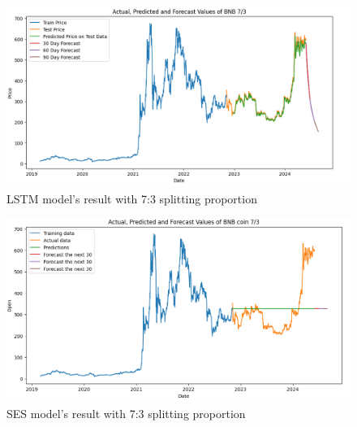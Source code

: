 \documentclass{ieeeojies}
\begin{document}
\vspace{-5mm}
\begin{figure}[H]
  \centering
  \begin{minipage}{0.8\linewidth}
    \centering
    \includegraphics[width=\linewidth]{Image/LSTM/LSTM_BNB_73.png}
    \caption{LSTM model's result with 7:3 splitting proportion}
    \label{fig:17}
  \end{minipage}
\end{figure}
\vspace{-5mm}
\begin{figure}[H]
  \centering
  \begin{minipage}{0.8\linewidth}
    \centering
    \includegraphics[width=\linewidth]{Image/SES/SES_BNB_73.png}
    \caption{SES model's result with 7:3 splitting proportion}
    \label{fig:18}
  \end{minipage}
\end{figure}
\vspace{-5mm}
\end{document}
